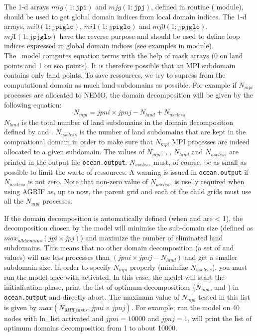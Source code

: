 \documentclass[../main/NEMO_manual]{subfiles}
\begin{document}
The 1-d arrays $mig(1:\texttt{jpi})$ and $mjg(1:\texttt{jpj})$, defined in  routine ( module), should be used to get global domain indices from local domain indices. The 1-d arrays, $mi0(1:\texttt{jpiglo})$, $mi1(1:\texttt{jpiglo})$ and $mj0(1:\texttt{jpjglo})$, $mj1(1:\texttt{jpjglo})$ have the reverse purpose and should be used to define loop indices expressed in global domain indices (see examples in  module).\\

The \NEMO\ model computes equation terms with the help of mask arrays (0 on land points and 1 on sea points). It is therefore possible that an MPI subdomain contains only land points. To save ressources, we try to supress from the computational domain as much land subdomains as possible. For example if $N_{mpi}$ processes are allocated to NEMO, the domain decomposition will be given by the following equation:
\[
  N_{mpi} = jpni \times jpnj - N_{land} + N_{useless}
\]
$N_{land}$ is the total number of land subdomains in the domain decomposition defined by  and . $N_{useless}$ is the number of land subdomains that are kept in the compuational domain in order to make sure that $N_{mpi}$ MPI processes are indeed allocated to a given subdomain. The values of $N_{mpi}$, , ,  $N_{land}$ and $N_{useless}$ are printed in the output file \texttt{ocean.output}. $N_{useless}$ must, of course, be as small as possible to limit the waste of ressources. A warning is issued in  \texttt{ocean.output} if $N_{useless}$ is not zero. Note that non-zero value of $N_{useless}$ is uselly required when using AGRIF as, up to now, the parent grid and each of the child grids must use all the $N_{mpi}$ processes.

If the domain decomposition is automatically defined (when  and  are < 1), the decomposition chosen by the model will minimise the sub-domain size (defined as $max_{all domains}(jpi \times jpj)$) and maximize the number of eliminated land subdomains. This means that no other domain decomposition (a set of  and  values) will use less processes than $(jpni  \times  jpnj - N_{land})$ and get a smaller subdomain size.
In order to specify $N_{mpi}$ properly (minimize $N_{useless}$), you must run the model once with  activated. In this case, the model will start the initialisation phase, print the list of optimum decompositions ($N_{mpi}$,  and ) in \texttt{ocean.output} and directly abort. The maximum value of $N_{mpi}$ tested in this list is given by $max(N_{MPI\_tasks}, jpni \times jpnj)$. For example, run the model on 40 nodes with ln\_list activated and $jpni = 10000$ and $jpnj = 1$, will print the list of optimum domains decomposition from 1 to about 10000.
\end{document}
